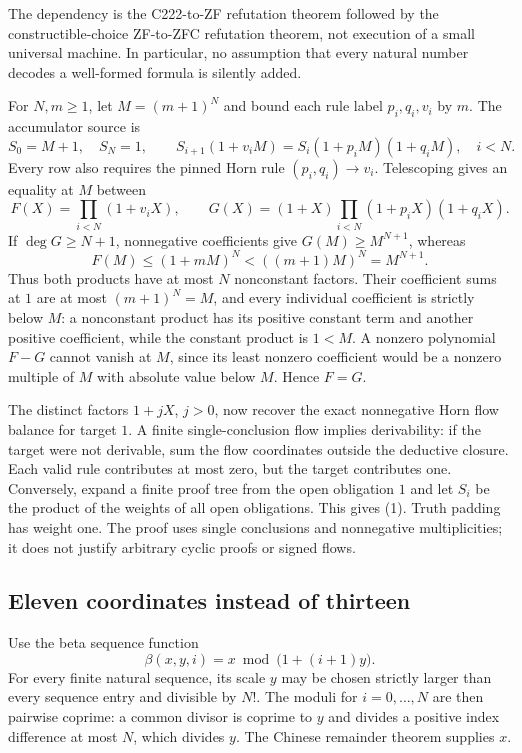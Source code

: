 The dependency is the C222-to-ZF refutation theorem followed by the
constructible-choice ZF-to-ZFC refutation theorem, not execution of a
small universal machine.  In particular, no assumption that every natural
number decodes a well-formed formula is silently added.

For $N,m\ge1$, let $M=(m+1)^N$ and bound each rule label $p_i,q_i,v_i$
by $m$.  The accumulator source is
\[
 S_0=M+1,\quad S_N=1,\qquad
 S_{i+1}(1+v_iM)=S_i(1+p_iM)(1+q_iM),\quad i<N.
 \tag{1}
\]
Every row also requires the pinned Horn rule $(p_i,q_i)\to v_i$.
Telescoping gives an equality at $M$ between
\[
 F(X)=\prod_{i<N}(1+v_iX),\qquad
 G(X)=(1+X)\prod_{i<N}(1+p_iX)(1+q_iX).
\]
If $\deg G\ge N+1$, nonnegative coefficients give
$G(M)\ge M^{N+1}$, whereas
\[
 F(M)\le(1+mM)^N<((m+1)M)^N=M^{N+1}.
\]
Thus both products have at most $N$ nonconstant factors.  Their coefficient
sums at $1$ are at most $(m+1)^N=M$, and every individual coefficient is
strictly below $M$: a nonconstant product has its positive constant term
and another positive coefficient, while the constant product is $1<M$.
A nonzero polynomial $F-G$ cannot vanish at $M$, since its least nonzero
coefficient would be a nonzero multiple of $M$ with absolute value below
$M$.  Hence $F=G$.

The distinct factors $1+jX$, $j>0$, now recover the exact nonnegative
Horn flow balance for target $1$.  A finite single-conclusion flow implies
derivability: if the target were not derivable, sum the flow coordinates
outside the deductive closure.  Each valid rule contributes at most zero,
but the target contributes one.  Conversely, expand a finite proof tree
from the open obligation $1$ and let $S_i$ be the product of the weights
of all open obligations.  This gives (1).  Truth padding has weight one.
The proof uses single conclusions and nonnegative multiplicities; it does
not justify arbitrary cyclic proofs or signed flows.

\subsection{Eleven coordinates instead of thirteen}

Use the beta sequence function
\[
 \beta(x,y,i)=x\bmod\bigl(1+(i+1)y\bigr).
\]
For every finite natural sequence, its scale $y$ may be chosen strictly
larger than every sequence entry and divisible by $N!$.  The moduli for
$i=0,\ldots,N$ are then pairwise coprime: a common divisor is coprime to
$y$ and divides a positive index difference at most $N$, which divides
$y$.  The Chinese remainder theorem supplies $x$.

